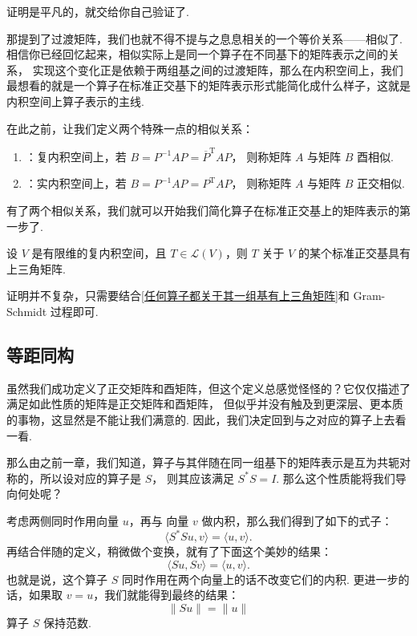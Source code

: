 证明是平凡的，就交给你自己验证了. 

那提到了过渡矩阵，我们也就不得不提与之息息相关的一个等价关系——相似了. 相信你已经回忆起来，相似实际上是同一个算子在不同基下的矩阵表示之间的关系，
实现这个变化正是依赖于两组基之间的过渡矩阵，那么在内积空间上，我们最想看的就是一个算子在标准正交基下的矩阵表示形式能简化成什么样子，这就是内积空间上算子表示的主线. 

在此之前，让我们定义两个特殊一点的相似关系：

\begin{definition}
    \begin{enumerate}

        \item {}：复内积空间上，若 $ B = P^{-1}AP = \overline{P}^{\mathrm{T}}AP $，
        则称矩阵 $ A $ 与矩阵 $ B $ 酉相似. 

        \item {}：实内积空间上，若 $ B = P^{-1}AP = {P}^{\mathrm{T}}AP $，
        则称矩阵 $ A $ 与矩阵 $ B $ 正交相似. 
    \end{enumerate}
\end{definition}

有了两个相似关系，我们就可以开始我们简化算子在标准正交基上的矩阵表示的第一步了. 

\begin{theorem}  
    设 $ V $ 是有限维的复内积空间，且 $ T \in \mathcal{L}(V) $，则 $ T $ 关于 $ V $ 的某个标准正交基具有上三角矩阵. 
\end{theorem}

证明并不复杂，只需要结合\ref{任何算子都关于其一组基有上三角矩阵}和 Gram-Schmidt 过程即可. %

\subsection{等距同构}

虽然我们成功定义了正交矩阵和酉矩阵，但这个定义总感觉怪怪的？它仅仅描述了满足如此性质的矩阵是正交矩阵和酉矩阵，
但似乎并没有触及到更深层、更本质的事物，这显然是不能让我们满意的. 因此，我们决定回到与之对应的算子上去看一看. 

那么由之前一章，我们知道，算子与其伴随在同一组基下的矩阵表示是互为共轭对称的，所以设对应的算子是 $ S $，
则其应该满足 $ S^*S = I $. 那么这个性质能将我们导向何处呢？

考虑两侧同时作用向量 $ u $，再与 向量 $ v $ 做内积，那么我们得到了如下的式子：
\[ \langle S^*Su, v \rangle = \langle u, v \rangle. \]
再结合伴随的定义，稍微做个变换，就有了下面这个美妙的结果：
\[ \langle Su, Sv \rangle = \langle u, v \rangle. \]
也就是说，这个算子 $ S $ 同时作用在两个向量上的话不改变它们的内积. 
更进一步的话，如果取 $ v = u $，我们就能得到最终的结果：
\[ \lVert Su \rVert = \lVert u \rVert \]
算子 $ S $ 保持范数. 

